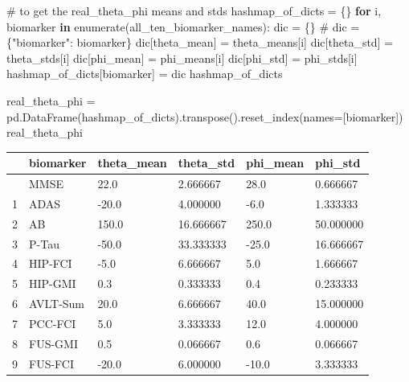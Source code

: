 \documentclass[
  letterpaper,
  DIV=11,
  numbers=noendperiod]{scrreprt}
\newenvironment{Shaded}{\begin{snugshade}}{\end{snugshade}}
\newcommand{\BuiltInTok}[1]{\textcolor[rgb]{0.00,0.23,0.31}{#1}}
\newcommand{\CommentTok}[1]{\textcolor[rgb]{0.37,0.37,0.37}{#1}}
\newcommand{\ControlFlowTok}[1]{\textcolor[rgb]{0.00,0.23,0.31}{\textbf{#1}}}
\newcommand{\KeywordTok}[1]{\textcolor[rgb]{0.00,0.23,0.31}{\textbf{#1}}}
\newcommand{\NormalTok}[1]{\textcolor[rgb]{0.00,0.23,0.31}{#1}}
\newcommand{\OperatorTok}[1]{\textcolor[rgb]{0.37,0.37,0.37}{#1}}
\newcommand{\StringTok}[1]{\textcolor[rgb]{0.13,0.47,0.30}{#1}}
\begin{document}
\begin{Shaded}
\begin{Highlighting}[]
\CommentTok{\# to get the real\_theta\_phi means and stds}
\NormalTok{hashmap\_of\_dicts }\OperatorTok{=}\NormalTok{ \{\}}
\ControlFlowTok{for}\NormalTok{ i, biomarker }\KeywordTok{in} \BuiltInTok{enumerate}\NormalTok{(all\_ten\_biomarker\_names):}
\NormalTok{    dic }\OperatorTok{=}\NormalTok{ \{\}}
    \CommentTok{\# dic = \{"biomarker": biomarker\}}
\NormalTok{    dic[}\StringTok{\textquotesingle{}theta\_mean\textquotesingle{}}\NormalTok{] }\OperatorTok{=}\NormalTok{ theta\_means[i]}
\NormalTok{    dic[}\StringTok{\textquotesingle{}theta\_std\textquotesingle{}}\NormalTok{] }\OperatorTok{=}\NormalTok{ theta\_stds[i]}
\NormalTok{    dic[}\StringTok{\textquotesingle{}phi\_mean\textquotesingle{}}\NormalTok{] }\OperatorTok{=}\NormalTok{ phi\_means[i]}
\NormalTok{    dic[}\StringTok{\textquotesingle{}phi\_std\textquotesingle{}}\NormalTok{] }\OperatorTok{=}\NormalTok{ phi\_stds[i]}
\NormalTok{    hashmap\_of\_dicts[biomarker] }\OperatorTok{=}\NormalTok{ dic }
\NormalTok{hashmap\_of\_dicts}

\NormalTok{real\_theta\_phi }\OperatorTok{=}\NormalTok{ pd.DataFrame(hashmap\_of\_dicts).transpose().reset\_index(names}\OperatorTok{=}\NormalTok{[}\StringTok{\textquotesingle{}biomarker\textquotesingle{}}\NormalTok{])}
\NormalTok{real\_theta\_phi}
\end{Highlighting}
\end{Shaded}

\begin{longtable}[]{@{}llllll@{}}
\toprule\noalign{}
& biomarker & theta\_mean & theta\_std & phi\_mean & phi\_std \\
\midrule\noalign{}
\endhead
\bottomrule\noalign{}
\endlastfoot
0 & MMSE & 22.0 & 2.666667 & 28.0 & 0.666667 \\
1 & ADAS & -20.0 & 4.000000 & -6.0 & 1.333333 \\
2 & AB & 150.0 & 16.666667 & 250.0 & 50.000000 \\
3 & P-Tau & -50.0 & 33.333333 & -25.0 & 16.666667 \\
4 & HIP-FCI & -5.0 & 6.666667 & 5.0 & 1.666667 \\
5 & HIP-GMI & 0.3 & 0.333333 & 0.4 & 0.233333 \\
6 & AVLT-Sum & 20.0 & 6.666667 & 40.0 & 15.000000 \\
7 & PCC-FCI & 5.0 & 3.333333 & 12.0 & 4.000000 \\
8 & FUS-GMI & 0.5 & 0.066667 & 0.6 & 0.066667 \\
9 & FUS-FCI & -20.0 & 6.000000 & -10.0 & 3.333333 \\
\end{longtable}
\end{document}
